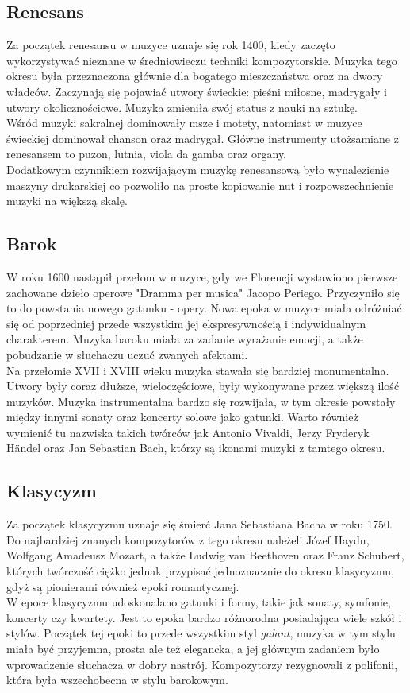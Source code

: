\documentclass[printmode, eng, openany]{mgr}
\newcommand\tab[1][1cm]{\hspace*{#1}}
\begin{document}
\subsection{Renesans}
\tab Za początek renesansu w muzyce uznaje się rok 1400, kiedy zaczęto wykorzystywać nieznane w średniowieczu techniki kompozytorskie. Muzyka tego okresu była przeznaczona głównie dla bogatego mieszczaństwa oraz na dwory władców. Zaczynają się pojawiać utwory świeckie: pieśni miłosne, madrygały i utwory okolicznościowe. Muzyka zmieniła swój status z nauki na sztukę. \\
\tab Wśród muzyki sakralnej dominowały msze i motety, natomiast w muzyce świeckiej dominował chanson oraz madrygał. Główne instrumenty utożsamiane z renesansem to puzon, lutnia, viola da gamba oraz organy. \\
\tab Dodatkowym czynnikiem rozwijającym muzykę renesansową było wynalezienie maszyny drukarskiej co pozwoliło na proste kopiowanie nut i rozpowszechnienie muzyki na większą skalę.
\subsection{Barok}
\tab W roku 1600 nastąpił przełom w muzyce, gdy we Florencji wystawiono pierwsze zachowane dzieło operowe "Dramma per musica" Jacopo Periego. Przyczyniło się to do powstania nowego gatunku - opery. Nowa epoka w muzyce miała odróżniać się od  poprzedniej przede wszystkim jej ekspresywnością i indywidualnym charakterem. Muzyka baroku miała za zadanie wyrażanie emocji, a także pobudzanie w słuchaczu uczuć zwanych afektami.\\
\tab Na przełomie XVII i XVIII wieku muzyka stawała się bardziej monumentalna. Utwory były coraz dłuższe, wieloczęściowe, były wykonywane przez większą ilość muzyków. Muzyka instrumentalna bardzo się rozwijała, w tym okresie powstały między innymi sonaty oraz koncerty solowe jako gatunki. Warto również wymienić tu nazwiska takich twórców jak Antonio Vivaldi, Jerzy Fryderyk Händel oraz Jan Sebastian Bach, którzy są ikonami muzyki z tamtego okresu.\\
\subsection{Klasycyzm}
\tab Za początek klasycyzmu uznaje się śmierć Jana Sebastiana Bacha w roku 1750. Do najbardziej znanych kompozytorów z tego okresu należeli Józef Haydn, Wolfgang Amadeusz Mozart, a także Ludwig van Beethoven oraz Franz Schubert, których twórczość ciężko jednak przypisać jednoznacznie do okresu klasycyzmu, gdyż są pionierami również epoki romantycznej.\\
\tab W epoce klasycyzmu udoskonalano gatunki i formy, takie jak sonaty, symfonie, koncerty czy kwartety. Jest to epoka bardzo różnorodna posiadająca wiele szkół i stylów. Początek tej epoki to przede wszystkim styl \textit{galant}, muzyka w tym stylu miała być przyjemna, prosta ale też elegancka, a jej głównym zadaniem było wprowadzenie słuchacza w dobry nastrój. Kompozytorzy rezygnowali z polifonii, która była wszechobecna w stylu barokowym. 
\end{document}
